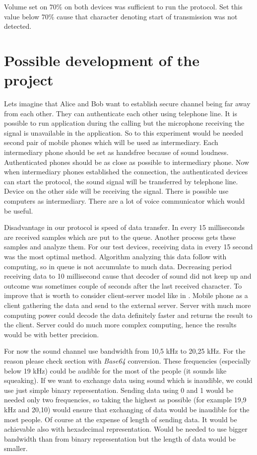 \documentclass[11pt,titlepage]{article}
\theoremstyle{plain}
\begin{document}
\vspace{5mm}

Volume set on 70\% on both devices was sufficient to run the protocol. Set this value below 70\% cause that character denoting start of transmission was not detected.

\section{Possible development of the project}
Lets imagine that Alice and Bob want to establish secure channel being far away from each other. They can authenticate each other using telephone line. It is possible to run application during the calling but the microphone receiving the signal is unavailable in the application. So to this experiment would be needed second pair of mobile phones which will be used as intermediary. Each intermediary phone should be set as handsfree because of sound loudness. Authenticated phones should be as close as possible to intermediary phone. Now when intermediary phones established the connection, the authenticated devices can start the protocol, the sound signal will be transferred by telephone line. Device on the other side will be receiving the signal. There is possible use computers as intermediary. There are a lot of voice communicator which would be useful.

\vspace{5mm}

Disadvantage in our protocol is speed of data transfer. In every 15 milliseconds are received samples which are put to the queue. Another process gets these samples and analyze them. For our test devices, receiving data in every 15 second was the most optimal method. Algorithm analyzing this data follow with computing, so in queue is not accumulate to much data. Decreasing period receiving data to 10 millisecond cause that decoder of sound did not keep up and outcome was sometimes couple of seconds after the last received character. To improve that is worth to consider client-server model like in \cite{chirp}. Mobile phone as a client gathering the data and send to the external server. Server with much more computing power could decode the data definitely faster and returns the result to the client. Server could do much more complex computing, hence the results would be with better precision.

\vspace{5mm}

For now the sound channel use bandwidth from 10,5 kHz to 20,25 kHz. For the reason please check section with \textit{Base64} conversion. These frequencies (especially below 19 kHz) could be audible for the most of the people (it sounds like squeaking). If we want to exchange data using sound which is inaudible, we could use just simple binary representation. Sending data using 0 and 1 would be needed only two frequencies, so taking the highest as possible (for example 19,9 kHz and 20,10) would ensure that exchanging of data would be inaudible for the most people. Of course at the expense of length of sending data. It would be achievable also with hexadecimal representation. Would be needed to use bigger bandwidth than from binary representation but the length of data would be smaller.
\end{document}
